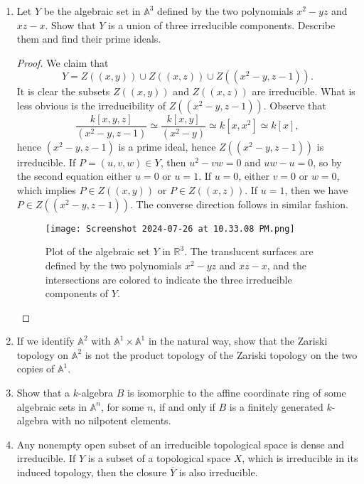 \documentclass[12pt]{article}
\newcommand{\A}{\mathbb{A}}
\newcommand{\R}{\mathbb{R}}
\theoremstyle{definition}
\begin{document}
\begin{enumerate} [label=\textbf{\arabic*.}, leftmargin=-0.05em]
\item Let $Y$ be the algebraic set in $\A^3$ defined by the two polynomials $x^2 - yz$ and $xz - x$. Show that $Y$ is a union of three irreducible components. Describe them and find their prime ideals.

\begin{proof}
    We claim that
    \begin{equation*}
        Y = Z((x, y)) \cup Z((x, z)) \cup Z((x^2 - y, z - 1)).
    \end{equation*}
    It is clear the subsets $Z((x, y))$ and $Z((x, z))$ are irreducible. What is less obvious is the irreducibility of $Z((x^2 - y, z - 1))$. Observe that
    \begin{equation*}
        \frac{k[x, y, z]}{(x^2 - y, z - 1)} \simeq \frac{k[x, y]}{(x^2 - y)} \simeq k[x, x^2] \simeq k[x],
    \end{equation*} 
    hence $(x^2 - y, z - 1)$ is a prime ideal, hence $Z((x^2 - y, z - 1))$ is irreducible.
    If $P = (u, v, w) \in Y$, then $u^2 - vw = 0$ and $uw - u = 0$, so by the second equation either $u = 0$ or $u = 1$. If $u = 0$, either $v = 0$ or $w = 0$, which implies $P \in Z((x, y))$ or $P \in Z((x, z))$. If $u = 1$, then we have $P \in Z((x^2 - y, z - 1))$. The converse direction follows in similar fashion.
    \newpage
    \begin{figure}
        \centering
        \texttt{[image: Screenshot 2024-07-26 at 10.33.08 PM.png]}
        \caption{Plot of the algebraic set $Y$ in $\R^3$. The translucent surfaces are defined by the two polynomials $x^2 - yz$ and $xz - x$, and the intersections are colored to indicate the three irreducible components of $Y$.}
    \end{figure}
\end{proof}

\item If we identify $\A^2$ with $\A^1 \times \A^1$ in the natural way, show that the Zariski topology on $\A^2$ is not the product topology of the Zariski topology on the two copies of $\A^1$.

\item Show that a $k$-algebra $B$ is isomorphic to the affine coordinate ring of some algebraic sets in $\A^n$, for some $n$, if and only if $B$ is a finitely generated $k$-algebra with no nilpotent elements.

\item Any nonempty open subset of an irreducible topological space is dense and irreducible. If $Y$ is a subset of a topological space $X$, which is irreducible in its induced topology, then the closure $\overline{Y}$ is also irreducible.


\end{enumerate}
\end{document}
